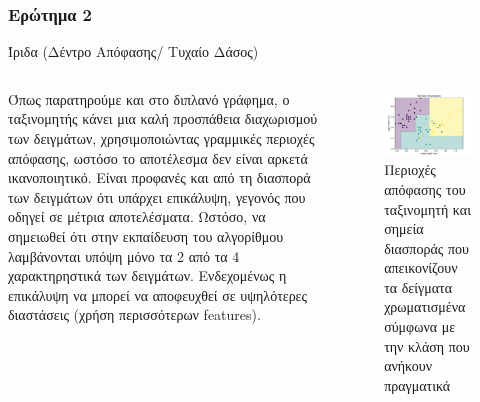 \documentclass{beamer}
\begin{document}
\subsubsection{Ερώτημα 2}
\begin{frame}{Ίριδα (Δέντρο Απόφασης/ Τυχαίο Δάσος)}
    \begin{columns}

    {\scriptsize Όπως παρατηρούμε και στο διπλανό γράφημα, ο ταξινομητής κάνει μια καλή προσπάθεια διαχωρισμού των δειγμάτων, χρησιμοποιώντας γραμμικές περιοχές απόφασης, ωστόσο το αποτέλεσμα δεν είναι αρκετά ικανοποιητικό. Είναι προφανές και από τη διασπορά των δειγμάτων ότι υπάρχει επικάλυψη, γεγονός που οδηγεί σε μέτρια αποτελέσματα. Ωστόσο, να σημειωθεί ότι στην εκπαίδευση του αλγορίθμου λαμβάνονται υπόψη μόνο τα 2 από τα 4 χαρακτηρηστικά των δειγμάτων. Ενδεχομένως η επικάλυψη να μπορεί να αποφευχθεί σε υψηλότερες διαστάσεις (χρήση περισσότερων  features).} 




    \begin{figure}
        \centering
            \includegraphics[width=\textwidth]{../plots/DB3.pdf}
            \caption{Περιοχές απόφασης του ταξινομητή και σημεία διασποράς που απεικονίζουν τα δείγματα χρωματισμένα σύμφωνα με την κλάση που ανήκουν πραγματικά}
            \label{fig:DB3}
    \end{figure}


\end{columns}
\end{frame}
\end{document}
